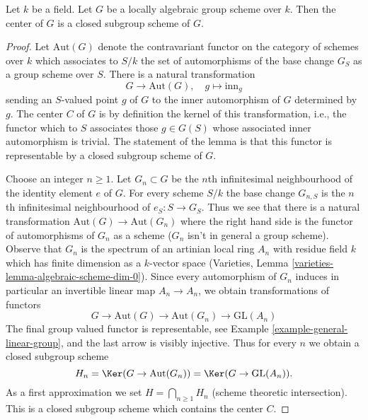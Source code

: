 \begin{lemma}
\label{lemma-algebraic-center}
Let $k$ be a field. Let $G$ be a locally algebraic group scheme over $k$.
Then the center of $G$ is a closed subgroup scheme of $G$.
\end{lemma}

\begin{proof}
Let $\text{Aut}(G)$ denote the contravariant functor on the category of
schemes over $k$ which associates to $S/k$ the set of automorphisms
of the base change $G_S$ as a group scheme over $S$. There is a natural
transformation
$$
G \longrightarrow \text{Aut}(G),\quad
g \longmapsto \text{inn}_g
$$
sending an $S$-valued point $g$ of $G$ to the inner automorphism of $G$
determined by $g$. The center $C$ of $G$ is by definition the kernel of
this transformation, i.e., the functor which to $S$ associates those
$g \in G(S)$ whose associated inner automorphism is trivial. The statement
of the lemma is that this functor is representable by a closed subgroup
scheme of $G$.

\medskip\noindent
Choose an integer $n \geq 1$. Let $G_n \subset G$ be the $n$th infinitesimal
neighbourhood of the identity element $e$ of $G$. For every scheme $S/k$
the base change $G_{n, S}$ is the $n$th infinitesimal neighbourhood of
$e_S : S \to G_S$. Thus we see that there is a natural transformation
$\text{Aut}(G) \to \text{Aut}(G_n)$ where the right hand side is the
functor of automorphisms of $G_n$ as a scheme ($G_n$ isn't in general
a group scheme). Observe that $G_n$ is the spectrum of an artinian
local ring $A_n$ with residue field $k$ which has finite dimension
as a $k$-vector space
(Varieties, Lemma \ref{varieties-lemma-algebraic-scheme-dim-0}).
Since every automorphism of $G_n$ induces in particular an invertible
linear map $A_n \to A_n$, we obtain transformations of functors
$$
G \to \text{Aut}(G) \to \text{Aut}(G_n) \to \text{GL}(A_n)
$$
The final group valued functor is representable, see
Example \ref{example-general-linear-group}, and the
last arrow is visibly injective.
Thus for every $n$ we obtain a closed subgroup scheme
$$
H_n = \Ker(G \to \text{Aut}(G_n)) = \Ker(G \to \text{GL}(A_n)).
$$
As a first approximation we set $H = \bigcap_{n \geq 1} H_n$
(scheme theoretic intersection). This is a closed subgroup scheme
which contains the center $C$.


\end{proof}
